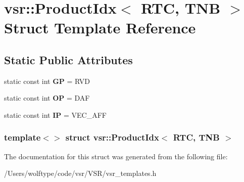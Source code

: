 \hypertarget{structvsr_1_1_product_idx_3_01_r_t_c_00_01_t_n_b_01_4}{\section{vsr\-:\-:Product\-Idx$<$ R\-T\-C, T\-N\-B $>$ Struct Template Reference}
\label{structvsr_1_1_product_idx_3_01_r_t_c_00_01_t_n_b_01_4}
}
\subsection*{Static Public Attributes}
\begin{DoxyCompactItemize}
\item 
\hypertarget{structvsr_1_1_product_idx_3_01_r_t_c_00_01_t_n_b_01_4_a8a9e82a368612f9e6ffe07e95d76dfae}{static const int {\bfseries G\-P} = R\-V\-D}\label{structvsr_1_1_product_idx_3_01_r_t_c_00_01_t_n_b_01_4_a8a9e82a368612f9e6ffe07e95d76dfae}

\item 
\hypertarget{structvsr_1_1_product_idx_3_01_r_t_c_00_01_t_n_b_01_4_a735aca3eb8cfa14e24c51f17f5c76569}{static const int {\bfseries O\-P} = D\-A\-F}\label{structvsr_1_1_product_idx_3_01_r_t_c_00_01_t_n_b_01_4_a735aca3eb8cfa14e24c51f17f5c76569}

\item 
\hypertarget{structvsr_1_1_product_idx_3_01_r_t_c_00_01_t_n_b_01_4_a8f9d79c1df8000e988c27985c3b6702d}{static const int {\bfseries I\-P} = V\-E\-C\-\_\-\-A\-F\-F}\label{structvsr_1_1_product_idx_3_01_r_t_c_00_01_t_n_b_01_4_a8f9d79c1df8000e988c27985c3b6702d}

\end{DoxyCompactItemize}
\subsubsection*{template$<$$>$ struct vsr\-::\-Product\-Idx$<$ R\-T\-C, T\-N\-B $>$}



The documentation for this struct was generated from the following file\-:\begin{DoxyCompactItemize}
\item 
/\-Users/wolftype/code/vsr/\-V\-S\-R/vsr\-\_\-templates.\-h\end{DoxyCompactItemize}

